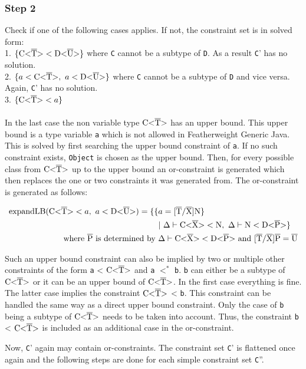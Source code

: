 \subsubsection{Step 2}
Check if one of the following cases applies. If not, the constraint set is in solved form:\\
1. $\{ \text{C<}\overline{\text{T}}\text{>} < \text{D<}\overline{\text{U}}\text{>} \}$ where \verb|C| cannot be a subtype of \verb|D|. As a result \verb|C|' has no solution.\\
2. $\{ a < \text{C<}\overline{\text{T}}\text{>}, \ a < \text{D<}\overline{\text{U}}\text{>} \}$ where \verb|C| cannot be a subtype of \verb|D| and vice versa. Again, \verb|C|' has no solution.\\
3. $\{ \text{C<}\overline{\text{T}}\text{>} < a \}$\\
\\
In the last case the non variable type $\text{C<}\overline{\text{T}}\text{>}$ has an upper bound. This upper bound is a type variable \verb|a| which is not allowed in Featherweight Generic Java.
This is solved by first searching the upper bound constraint of \verb|a|. If no such constraint exists, \verb|Object| is chosen as the upper bound. Then, for every possible class
from $\text{C<}\overline{\text{T}}\text{>}$ up to the upper bound an or-constraint is generated which then replaces the one or two constraints it was generated from.
The or-constraint is generated as follows:

\begin{align*}
    \text{expandLB} ( \text{C<}\overline{\text{T}}\text{>} < a, \ a < \text{D<}\overline{\text{U}}\text{>} ) = \{ \{ &a = \text{[}\overline{\text{T}}/\overline{\text{X}}\text{]N} \} \\
     &| \ \Delta \vdash \text{C<}\overline{\text{X}}\text{>} < \text{N}, \ \Delta \vdash \text{N} < \text{D<}\overline{\text{P}}\text{>} \}\\
    \text{where} \ \overline{\text{P}} \ \text{is determined by } & \Delta \vdash \text{C<}\overline{\text{X}}\text{>} < \text{D<}\overline{\text{P}}\text{>} \ \text{and} \ \text{[}\overline{\text{T}}/\overline{\text{X}}\text{]}\overline{\text{P}} = \overline{\text{U}}\\
\end{align*}

Such an upper bound constraint can also be implied by two or multiple other constraints of the form \verb|a| < $\text{C<}\overline{\text{T}}\text{>}$ and \verb|a| $<^*$ \verb|b|. \verb|b| can either be a subtype of $\text{C<}\overline{\text{T}}\text{>}$ or it can be an upper bound of $\text{C<}\overline{\text{T}}\text{>}$. In the first case everything is fine.
The latter case implies the constraint $\text{C<}\overline{\text{T}}\text{>}$ < \verb|b|. This constraint can be handled the same way as a direct upper bound constraint. Only the case of \verb|b| being a subtype of $\text{C<}\overline{\text{T}}\text{>}$ needs to be taken into account. Thus, the constraint \verb|b| < $\text{C<}\overline{\text{T}}\text{>}$ is included as an additional case in the or-constraint.

Now, \verb|C|' again may contain or-constraints. The constraint set \verb|C|' is flattened once again and the following steps are done for each simple constraint set \verb|C|''.

